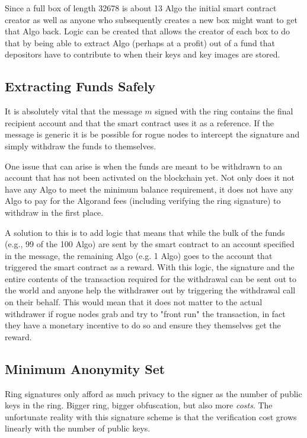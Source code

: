 \documentclass[9pt]{article}
\begin{document}
Since a full box of length 32678 is about 13 Algo the initial smart contract creator as well as anyone who subsequently creates a new box might want to get that Algo back. Logic can be created that allows the creator of each box to do that by being able to extract Algo (perhaps at a profit) out of a fund that depositors have to contribute to when their keys and key images are stored.

\subsection{Extracting Funds Safely}

It is absolutely vital that the message $m$ signed with the ring contains the final recipient account and that the smart contract uses it as a reference. If the message is generic it is be possible for rogue nodes to intercept the signature and simply withdraw the funds to themselves.

One issue that can arise is when the funds are meant to be withdrawn to an account that has not been activated on the blockchain yet. Not only does it not have any Algo to meet the minimum balance requirement, it does not have any Algo to pay for the Algorand fees (including verifying the ring signature) to withdraw in the first place.

A solution to this is to add logic that means that while the bulk of the funds (e.g., 99 of the 100 Algo) are sent by the smart contract to an account specified in the message, the remaining Algo (e.g. 1 Algo) goes to the account that triggered the smart contract as a reward. With this logic, the signature and the entire contents of the transaction required for the withdrawal can be sent out to the world and anyone help the withdrawer out by triggering the withdrawal call on their behalf. This would mean that it does not matter to the actual withdrawer if rogue nodes grab and try to "front run" the transaction, in fact they have a monetary incentive to do so and ensure they themselves get the reward.


\subsection{Minimum Anonymity Set}

Ring signatures only afford as much privacy to the signer as the number of public keys in the ring. Bigger ring, bigger obfuscation, but also more \textit{costs}. The unfortunate reality with this signature scheme is that the verification cost grows linearly with the number of public keys.
\end{document}
